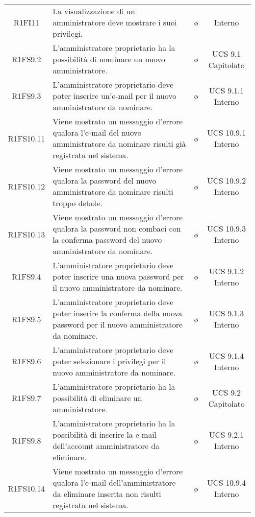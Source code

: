 {\begin{longtable}{ c C{6.5cm} c c}
R1FI11 & La visualizzazione di un amministratore deve mostrare i suoi privilegi. & \o & Interno \\

R1FS9.2 & L'amministratore proprietario ha la possibilità di nominare un nuovo amministratore. & \o & UCS 9.1 Capitolato\\

R1FS9.3 & L'amministratore proprietario deve poter inserire un'e-mail per il nuovo amministratore da nominare. & \o & UCS 9.1.1 Interno\\

R1FS10.11 & Viene mostrato un messaggio d'errore qualora l'e-mail del nuovo amministratore da nominare risulti già registrata nel sistema. & \o & UCS 10.9.1 Interno\\

R1FS10.12 & Viene mostrato un messaggio d'errore qualora la password del nuovo amministratore da nominare risulti troppo debole. & \o & UCS 10.9.2 Interno\\

R1FS10.13 & Viene mostrato un messaggio d'errore qualora la password non combaci con la conferma password del nuovo amministratore da nominare. & \o & UCS 10.9.3 Interno\\

R1FS9.4 & L'amministratore proprietario deve poter inserire una nuova password per il nuovo amministratore da nominare. & \o & UCS 9.1.2 Interno\\

R1FS9.5 & L'amministratore proprietario deve poter inserire la conferma della nuova password per il nuovo amministratore da nominare. & \o & UCS 9.1.3 Interno\\

R1FS9.6 & L'amministratore proprietario deve poter selezionare i privilegi per il nuovo amministratore da nominare. & \o & UCS 9.1.4 Interno\\

R1FS9.7 & L'amministratore proprietario ha la possibilità di eliminare un amministratore. & \o & UCS 9.2 Capitolato\\

R1FS9.8 & L'amministratore proprietario ha la possibilità di inserire la e-mail dell'account amministratore da eliminare. & \o & UCS 9.2.1 Interno\\

R1FS10.14 & Viene mostrato un messaggio d'errore qualora l'e-mail dell'amministratore da eliminare inserita non risulti registrata nel sistema. & \o & UCS 10.9.4 Interno\\


\end{longtable}}
